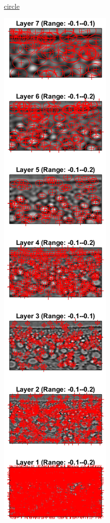 \begin{figure}
\begin{subfigure}[t]{0.3\textwidth}
		\caption{\href{./hw3/problem1/SSXc.png}{circle}}\label{fig:13a}
	\end{subfigure}
	\begin{subfigure}[t]{0.3\textwidth}
	    \centering
		\includegraphics[height=0.92\textheight]{hw3/problem1/SSXf.png}

\end{subfigure}
\end{figure}
